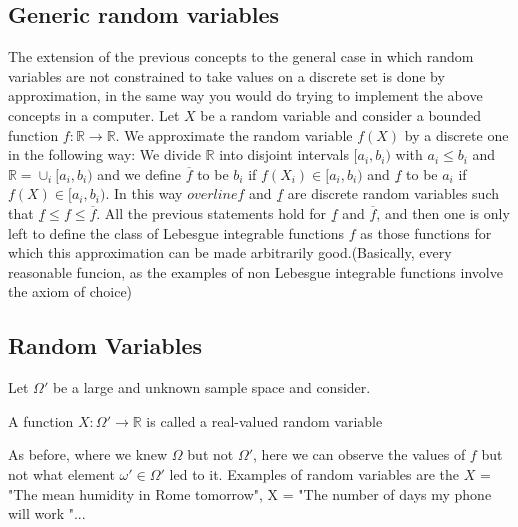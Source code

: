 \subsection{Generic random variables}

	The extension of the previous concepts to the general case in which random variables are not constrained to take values on a discrete set is done by approximation, in the same way you would do trying to implement the above concepts in a computer. Let $X$ be a random variable and consider a bounded function $f: \mathbb R \to \mathbb R$. We approximate the random variable $f(X)$ by a discrete one in the following way: 
	We divide $\mathbb R$ into disjoint intervals $[a_i, b_i)$ with $a_i \leq b_i$ and $\mathbb R = \cup_{i} [a_i,b_i)$ and we define $\overline f$ to be $b_i$ if $f(X_i) \in [a_i, b_i)$ and $\underline f$ to be $a_i$ if $f(X) \in [a_i,b_i)$. In this way $overline f$ and $\underline f$  are discrete random variables such that $\underline f \leq f \leq \overline f$. All the previous statements hold for $\underline f$ and $ \overline f$, and then one is  only left to define the class of Lebesgue integrable functions $f$ as those functions for which this approximation can be made arbitrarily good.(Basically, every reasonable funcion, as the examples of non Lebesgue integrable functions involve the axiom of choice)

		\subsection{Random Variables}
		\label{ss:random_variable}
	Let $\Omega'$ be a large and unknown sample space and consider. 
	\begin{definition} 
		\label{d:random_variable}
		A function $X: \Omega' \to \mathbb R$ is called a real-valued random variable
	\end{definition}
	As before, where we knew $\Omega$ but not $\Omega'$, here we can observe the values of $f$ but not what element $\omega' \in \Omega'$ led to it. Examples of random variables are the $X$ = "The mean humidity in Rome tomorrow", X = "The number of days my phone will work "... 

